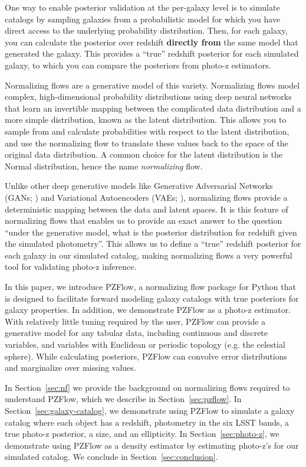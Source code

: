 \documentclass[twocolumn,twocolappendix]{aastex631}
\begin{document}
One way to enable posterior validation at the per-galaxy level is to simulate catalogs by sampling galaxies from a probabilistic model for which you have direct access to the underlying probability distribution.
Then, for each galaxy, you can calculate the posterior over redshift \textbf{directly from} the same model that generated the galaxy.
This provides a ``true'' redshift posterior for each simulated galaxy, to which you can compare the posteriors from photo-z estimators.

Normalizing flows are a generative model of this variety.
Normalizing flows model complex, high-dimensional probability distributions using deep neural networks that learn an invertible mapping between the complicated data distribution and a more simple distribution, known as the latent distribution.
This allows you to sample from and calculate probabilities with respect to the latent distribution, and use the normalizing flow to translate these values back to the space of the original data distribution.
A common choice for the latent distribution is the Normal distribution, hence the name \emph{normalizing} flow.

Unlike other deep generative models like Generative Adversarial Networks (GANs; \citealt{goodfellow2014}) and Variational Autoencoders (VAEs; \citealt{kingma2014}), normalizing flows provide a deterministic mapping between the data and latent spaces.
It is this feature of normalizing flows that enables us to provide an exact answer to the question ``under the generative model, what is the posterior distribution for redshift given the simulated photometry''.
This allows us to define a ``true'' redshift posterior for each galaxy in our simulated catalog, making normalizing flows a very powerful tool for validating photo-z inference.

In this paper, we introduce PZFlow, a normalizing flow package for Python that is designed to facilitate forward modeling galaxy catalogs with true posteriors for galaxy properties.
In addition, we demonstrate PZFlow as a photo-z estimator.
With relatively little tuning required by the user, PZFlow can provide a generative model for any tabular data, including continuous and discrete variables, and variables with Euclidean or periodic topology (e.g. the celestial sphere).
While calculating posteriors, PZFlow can convolve error distributions and marginalize over missing values.

In Section~\ref{sec:nf} we provide the background on normalizing flows required to understand PZFlow, which we describe in Section~\ref{sec:pzflow}.
In Section~\ref{sec:galaxy-catalog}, we demonstrate using PZFlow to simulate a galaxy catalog where each object has a redshift, photometry in the six LSST bands, a true photo-z posterior, a size, and an ellipticity.
In Section~\ref{sec:photo-z}, we demonstrate using PZFlow as a density estimator by estimating photo-z's for our simulated catalog.
We conclude in Section~\ref{sec:conclusion}.
\end{document}
